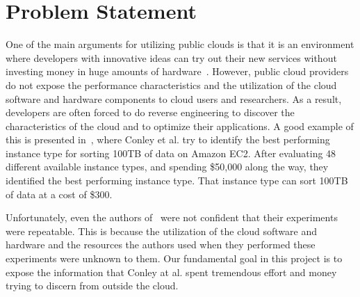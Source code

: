 \section{Problem Statement}
\label{sec:ProblemStatement}

%

One of the main arguments for utilizing public clouds is that it is an environment where developers with innovative ideas can try out their new services without investing money in huge amounts of hardware~\cite{Armbrust2009}. However, public cloud providers do not expose the performance characteristics and the utilization of the cloud software and hardware components to cloud users and researchers. As a result, developers are often forced to do reverse engineering to discover the characteristics of the cloud and to optimize their applications. A good example of this is presented in~\cite{conley2015achieving}, where Conley et al. try to identify the best performing instance type for sorting 100TB of data on Amazon EC2. After evaluating 48 different available instance types, and spending \$50,000 along the way, they identified the best performing instance type. That instance type can sort 100TB of data at a cost of \$300. 

Unfortunately, even the authors of~\cite{conley2015achieving} were not confident that their experiments were repeatable. This is because the utilization of the cloud software and hardware and the resources the authors used when they performed these experiments were unknown to them. Our fundamental goal in this project is to expose the information that Conley at al. spent tremendous effort and money trying to discern from outside the cloud. 

